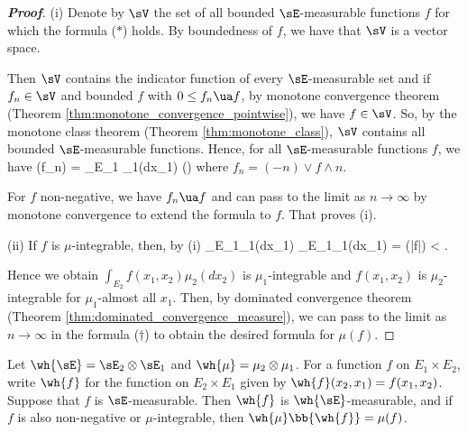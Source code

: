 \begin{proof}[\bf Proof]
\ben
\item [(i)] Denote by $\sV$ the set of all bounded $\sE$-measurable functions $f$ for which the formula ($*$) holds. By boundedness of $f$, we have that $\sV$ is a vector space.

Then $\sV$ contains the indicator function of every $\sE$-measurable set and if $f_n \in \sV$ and bounded $f$ with $0\leq f_n\ua f$, by monotone convergence theorem (Theorem \ref{thm:monotone_convergence_pointwise}), we have $f\in \sV$. So, by the monotone class theorem (Theorem \ref{thm:monotone_class}), $\sV$ contains all bounded $\sE$-measurable functions. Hence, for all $\sE$-measurable functions $f$, we have
\be
\mu(f_n) = \int_{E_1} \mu_1(dx_1) \quad\quad (\dag)
\ee
where $f_n = (-n) \lor f \land n$.

For $f$ non-negative, we have $f_n \ua f$ and can pass to the limit as $n \to \infty$ by monotone convergence to extend the formula to $f$. That proves (i).

\item [(ii)] If $f$ is $\mu$-integrable, then, by (i)
\be
\int_{E_1}\mu_1(dx_1) \leq \int_{E_1}\mu_1(dx_1) = \mu(|f|) < \infty.
\ee

Hence we obtain $\int_{E_2} f(x_1, x_2)\mu_2(dx_2)$ is $\mu_1$-integrable and $f(x_1, x_2)$ is $\mu_2$-integrable for $\mu_1$-almost all $x_1$. Then, by dominated convergence theorem (Theorem \ref{thm:dominated_convergence_measure}), we can pass to the limit as $n \to \infty$ in the formula ($\dag$) to obtain the desired formula for $\mu(f)$.
\een
\end{proof}

\begin{proposition}\label{pro:product_measure}
Let $\wh{\sE} = \sE_2 \otimes \sE_1$ and $\wh{\mu} = \mu_2 \otimes \mu_1$. For a function $f$ on $E_1 \times E_2$, write $\wh{f}$ for the function on $E_2 \times E_1$ given by $\wh{f}(x_2, x_1) = f(x_1, x_2)$. Suppose that $f$ is $\sE$-measurable. Then $\wh{f}$ is $\wh{\sE}$-measurable, and if $f$ is also non-negative or $\mu$-integrable, then $\wh{\mu}\bb{\wh{f}} = \mu(f)$.
\end{proposition}

